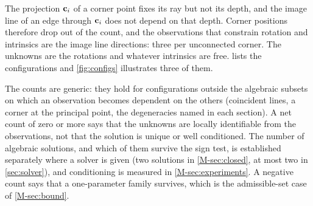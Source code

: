 The projection $\mathbf{c}_i$ of a corner point fixes its ray but not its depth, and the image line of an edge through $\mathbf{c}_i$ does not depend on that depth. Corner positions therefore drop out of the count, and the observations that constrain rotation and intrinsics are the image line directions: three per unconnected corner. The unknowns are the rotations and whatever intrinsics are free.  lists the configurations and \cref{fig:configs} illustrates three of them.

The counts are generic: they hold for configurations outside the algebraic subsets on which an observation becomes dependent on the others (coincident lines, a corner at the principal point, the degeneracies named in each section). A net count of zero or more says that the unknowns are locally identifiable from the observations, not that the solution is unique or well conditioned. The number of algebraic solutions, and which of them survive the sign test, is established separately where a solver is given (two solutions in \cref{M-sec:closed}, at most two in \cref{sec:solver}), and conditioning is measured in \cref{M-sec:experiments}. A negative count says that a one-parameter family survives, which is the admissible-set case of \cref{M-sec:bound}.

